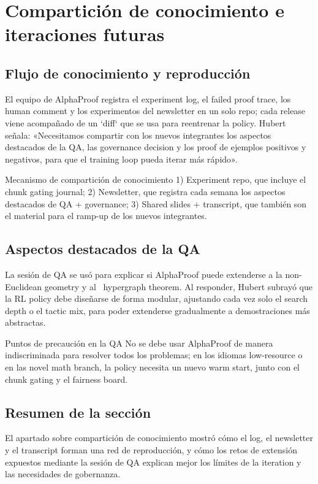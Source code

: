 \section{Compartición de conocimiento e iteraciones futuras}

\subsection{Flujo de conocimiento y reproducción}
El equipo de AlphaProof registra el experiment log, el failed proof trace, los human comment y los experimentos del newsletter en un solo repo; cada release viene acompañado de un `diff` que se usa para reentrenar la policy. Hubert señala: «Necesitamos compartir con los nuevos integrantes los aspectos destacados de la QA, las governance decision y los proof de ejemplos positivos y negativos, para que el training loop pueda iterar más rápido».
\begin{importantbox}{Mecanismo de compartición de conocimiento}
1) Experiment repo, que incluye el chunk gating journal; 2) Newsletter, que registra cada semana los aspectos destacados de QA + governance; 3) Shared slides + transcript, que también son el material para el ramp-up de los nuevos integrantes.
\end{importantbox}

\subsection{Aspectos destacados de la QA}
La sesión de QA se usó para explicar si AlphaProof puede extenderse a la non-Euclidean geometry y al ~hypergraph theorem. Al responder, Hubert subrayó que la RL policy debe diseñarse de forma modular, ajustando cada vez solo el search depth o el tactic mix, para poder extenderse gradualmente a demostraciones más abstractas.
\begin{warningbox}{Puntos de precaución en la QA}
No se debe usar AlphaProof de manera indiscriminada para resolver todos los problemas; en los idiomas low-resource o en las novel math branch, la policy necesita un nuevo warm start, junto con el chunk gating y el fairness board.
\end{warningbox}

\subsection{Resumen de la sección}
El apartado sobre compartición de conocimiento mostró cómo el log, el newsletter y el transcript forman una red de reproducción, y cómo los retos de extensión expuestos mediante la sesión de QA explican mejor los límites de la iteration y las necesidades de gobernanza.
\newpage

